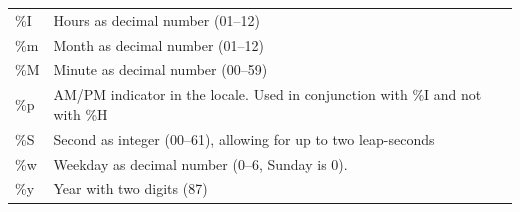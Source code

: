 \documentclass[]{book}
\begin{document}
\begin{longtable}[]{@{}ll@{}}
\begin{minipage}[t]{0.34\columnwidth}\raggedright\strut
\%I\strut
\end{minipage} & \begin{minipage}[t]{0.48\columnwidth}\raggedright\strut
Hours as decimal number (01--12)\strut
\end{minipage}\tabularnewline
\begin{minipage}[t]{0.34\columnwidth}\raggedright\strut
\%m\strut
\end{minipage} & \begin{minipage}[t]{0.48\columnwidth}\raggedright\strut
Month as decimal number (01--12)\strut
\end{minipage}\tabularnewline
\begin{minipage}[t]{0.34\columnwidth}\raggedright\strut
\%M\strut
\end{minipage} & \begin{minipage}[t]{0.48\columnwidth}\raggedright\strut
Minute as decimal number (00--59)\strut
\end{minipage}\tabularnewline
\begin{minipage}[t]{0.34\columnwidth}\raggedright\strut
\%p\strut
\end{minipage} & \begin{minipage}[t]{0.48\columnwidth}\raggedright\strut
AM/PM indicator in the locale. Used in conjunction with \%I and not with
\%H\strut
\end{minipage}\tabularnewline
\begin{minipage}[t]{0.34\columnwidth}\raggedright\strut
\%S\strut
\end{minipage} & \begin{minipage}[t]{0.48\columnwidth}\raggedright\strut
Second as integer (00--61), allowing for up to two leap-seconds\strut
\end{minipage}\tabularnewline
\begin{minipage}[t]{0.34\columnwidth}\raggedright\strut
\%w\strut
\end{minipage} & \begin{minipage}[t]{0.48\columnwidth}\raggedright\strut
Weekday as decimal number (0--6, Sunday is 0).\strut
\end{minipage}\tabularnewline
\begin{minipage}[t]{0.34\columnwidth}\raggedright\strut
\%y\strut
\end{minipage} & \begin{minipage}[t]{0.48\columnwidth}\raggedright\strut
Year with two digits (87)\strut
\end{minipage}\tabularnewline

\end{longtable}
\end{document}
